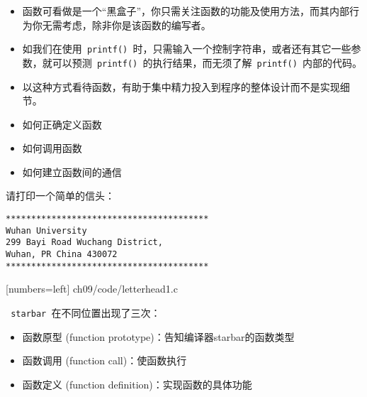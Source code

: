 \begin{frame}[fragile]
\begin{itemize}
\item
函数可看做是一个“黑盒子”，你只需关注函数的功能及使用方法，而其内部行为你无需考虑，除非你是该函数的编写者。\\[0.1in]
\item
如我们在使用\lstinline| printf() |时，只需输入一个控制字符串，或者还有其它一些参数，就可以预测\lstinline| printf() |的执行结果，而无须了解\lstinline| printf() |内部的代码。
\\[0.1in]
\item
以这种方式看待函数，有助于集中精力投入到程序的整体设计而不是实现细节。
\end{itemize}
\end{frame}

\begin{frame}[fragile]
\begin{itemize}
\item 如何正确定义函数\\[0.1in]
\item 如何调用函数\\[0.1in]
\item 如何建立函数间的通信
\end{itemize}

\end{frame}

\begin{frame}[fragile]
请打印一个简单的信头：
\begin{lstlisting}[backgroundcolor=\color{red!10}]
****************************************
Wuhan University
299 Bayi Road Wuchang District,
Wuhan, PR China 430072
****************************************
\end{lstlisting}
\end{frame}

\begin{frame}

[numbers=left]
{ch09/code/letterhead1.c}
\end{frame}


\begin{frame}[fragile]
\lstinline| starbar |在不同位置出现了三次：\vspace{0.1in}

\begin{itemize}
\item 函数原型{ (function prototype)}：告知编译器starbar的函数类型\\[0.1in]
\item 函数调用{ (function call)}：使函数执行\\[0.1in]
\item 函数定义{ (function definition)}：实现函数的具体功能
\end{itemize}
\end{frame}

